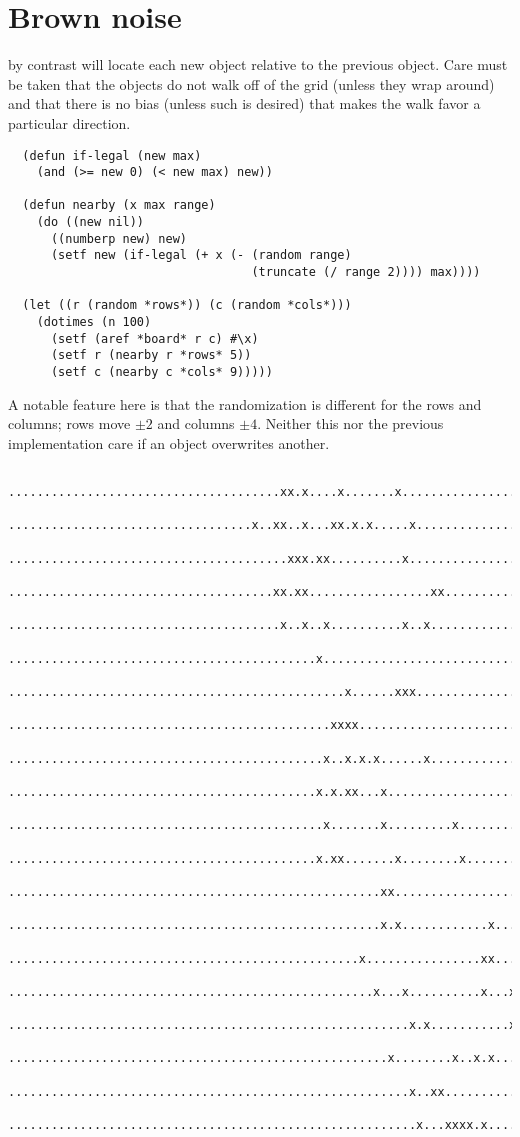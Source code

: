 \documentclass[12pt,a4paper]{article}
\begin{document}
\section*{Brown noise}

by contrast will locate each new object relative to the previous object.
Care must be taken that the objects do not walk off of the grid (unless
they wrap around) and that there is no bias (unless such is desired)
that makes the walk favor a particular direction.

\begin{verbatim}
  (defun if-legal (new max)
    (and (>= new 0) (< new max) new))

  (defun nearby (x max range)
    (do ((new nil))
      ((numberp new) new)
      (setf new (if-legal (+ x (- (random range)
                                  (truncate (/ range 2)))) max))))

  (let ((r (random *rows*)) (c (random *cols*)))
    (dotimes (n 100)
      (setf (aref *board* r c) #\x)
      (setf r (nearby r *rows* 5))
      (setf c (nearby c *cols* 9)))))
\end{verbatim}

A notable feature here is that the randomization is different for the
rows and columns; rows move $\pm 2$ and columns $\pm 4$. Neither this
nor the previous implementation care if an object overwrites another.

\begin{verbatim}
  ......................................xx.x....x.......x.................
  ..................................x..xx..x...xx.x.x.....x...............
  .......................................xxx.xx..........x................
  .....................................xx.xx.................xx...........
  ......................................x..x..x..........x..x.............
  ...........................................x............................
  ...............................................x......xxx...............
  .............................................xxxx.......................
  ............................................x..x.x.x......x.............
  ...........................................x.x.xx...x...................
  ............................................x.......x.........x.........
  ...........................................x.xx.......x........x........
  ....................................................xx..................
  ....................................................x.x............x....
  .................................................x................xx....
  ...................................................x...x..........x...x.
  ........................................................x.x...........x.
  .....................................................x........x..x.x....
  ........................................................x..xx...........
  .........................................................x...xxxx.x.....
\end{verbatim}
\end{document}
